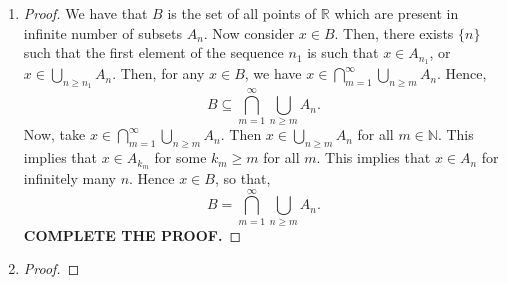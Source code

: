 \documentclass{article}
\theoremstyle{definition}
\theoremstyle{remark}
\theoremstyle{definition}
\theoremstyle{definition}
\theoremstyle{definition}
\DeclarePairedDelimiter\abs{\lvert}{\rvert}
\newcommand{\bunion}{\bigcup}
\newcommand{\bintrs}{\bigcap}
\newcommand{\where}{\;\vert\;}
\newcommand{\R}{\mathbb{R}}
\newcommand{\N}{\mathbb{N}}
\newcommand{\lom}[1]{\lambda^*\left (#1\right )}
\newcommand{\set}[1]{\mathscr{#1}}
\begin{document}
\begin{enumerate}
{\begin{proof}
		First, take any infinite sequence $ \{(a_i,b_i)\}\in \set{C}_A $. Then $ \{\alpha(a_i,b_i)\} \in \set{C}_{\alpha A} $ because if $ A \subseteq \bunion_i (a_i,b_i) $, then $ \alpha A \subseteq \bunion_i \alpha(a_i,b_i) $ where $ \alpha(a_i,b_i) = (\alpha a_i,\alpha b_i) $ if $ \alpha > 0 $ or $ = (\alpha b_i, \alpha a_i) $ if $ \alpha <0 $. Hence, 
		\[ \alpha \set{C}_A \subseteq \set{C}_{\alpha A}. \]
		To see the converse, first note that the case of $ \alpha = 0 $ is trivial, so we would take $ \alpha \neq 0 $. Now, take $ \{(c_i,d_i)\}\in \set{C}_{\alpha A} $. Hence $ \alpha A \subseteq \bunion_i (c_i,d_i)  $. Now, $ \frac{1}{\alpha} \cdot \alpha A = A \subseteq \bunion_i \frac{1}{\alpha}\left (c_i,d_i\right ) $. Therefore, $ \{\frac{1}{\alpha}(c_i,d_i)\} \in \set{C}_A \implies \{(c_i,d_i)\} \in \alpha \set{C}_A$. Hence $ \set{C}_{\alpha A} \subseteq \alpha \set{C}_A $. Hence $ \set{C}_{\alpha A} = \alpha\set{C}_A $. Hence, we get that $ \set{L}_{\alpha A} = \abs{\alpha}\set{L}_A $ because $ \sum_i l(\alpha I_n) = \sum_{i} \alpha(b_i-a_i)$ if $ \alpha > 0$ or $ = \sum_i \alpha(a_i-b_i) $ if $ \alpha<0 $. Hence we can write $ \alpha\set{L}_A = \{ \sum_i \abs{\alpha}(b_i - a_i)\where \{(a_i,b_i)\} \in \set{C}_A  \} $. Now, $ \inf \set{L}_{\alpha A} = \inf \abs{\alpha} \set{L}_A \implies \lom{\alpha A} = \abs{\alpha} \lom{A}$.
\end{proof}}
\item {\begin{proof}
		We have that $ B $ is the set of all points of $ \R $ which are present in infinite number of subsets $ A_n $. Now consider $ x\in B $. Then, there exists $ \{n\} $ such that the first element of the sequence $ n_1 $ is such that $ x\in A_{n_1} $, or $ x\in \bunion_{n\ge n_1} A_n $. Then, for any $ x\in B $, we have $ x\in\bintrs_{m=1}^{\infty}  \bunion_{n\ge m} A_n $. Hence,
		\[B\subseteq \bintrs_{m=1}^{\infty}  \bunion_{n\ge m} A_n.\]
		Now, take $ x\in \bintrs_{m=1}^{\infty} \bunion_{n\ge m} A_n $. Then $ x\in \bunion_{n\ge m} A_n $ for all $ m\in \N $. This implies that $ x\in A_{k_m} $ for some $ k_m \ge m $ for all $ m $. This implies that $ x\in A_n $ for infinitely many $ n $. Hence $ x\in B $, so that,
		\[B = \bintrs_{m=1}^{\infty}\bunion_{n\ge m} A_n.\]
		\textbf{COMPLETE THE PROOF.}
\end{proof}}
\item {\begin{proof}
		
\end{proof}}
\end{enumerate}
\newpage
\end{document}
